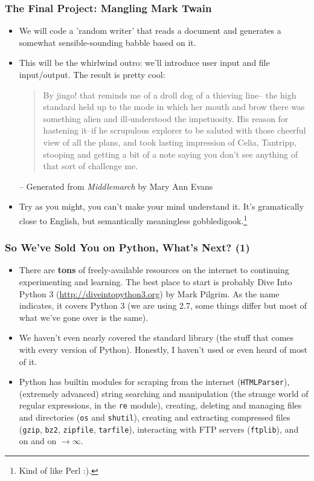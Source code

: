 \documentclass[10pt]{beamer}
\begin{document}
\begin{frame}
  \frametitle{The Final Project: Mangling Mark Twain}
  \begin{itemize}
    \item We will code a 'random writer' that reads a document and generates a somewhat sensible-sounding babble based on it.
    \item This will be the whirlwind outro: we'll introduce user input and file input/output.
      The result is pretty cool: \\
      \begin{quote}
        \small
        By jingo! that reminds me of a droll dog of a thieving line-- the high standard held up to the mode in which her mouth and brow there was something alien and ill-understood the impetuosity.  
        His reason for hastening it--if he scrupulous explorer to be saluted with those cheerful view of all the plans, and took lasting impression of Celia, Tantripp, stooping and getting a bit of a note saying you don't see anything of that sort of challenge me.
      \end{quote}
      \begin{flushright}
        \footnotesize -- Generated from \emph{Middlemarch} by Mary Ann Evans
      \end{flushright}
      \item Try as you might, you can't make your mind understand it.
        It's gramatically close to English, but semantically meaningless gobbledigook.\footnote{Kind of like Perl :).}
  \end{itemize}
\end{frame}

\begin{frame}
  \frametitle{So We've Sold You on Python, What's Next? (1)}
  \begin{itemize}
    \item There are \textbf{tons} of freely-available resources on the internet to continuing experimenting and learning.
    The best place to start is probably Dive Into Python 3 (\href{http://diveintopython3.org}{http://diveintopython3.org}) by Mark Pilgrim.  As the name indicates, it covers Python 3 (we are using 2.7, some things differ but most of what we've gone over is the same).
    \item We haven't even nearly covered the standard library (the stuff that comes with every version of Python). 
      Honestly, I haven't used or even heard of most of it.
    \item Python has builtin modules for scraping from the internet (\texttt{HTMLParser}), (extremely advanced) string searching and manipulation (the strange world of regular expressions, in the \texttt{re} module), creating, deleting and managing files and directories (\texttt{os} and \texttt{shutil}), creating and extracting compressed files (\texttt{gzip}, \texttt{bz2}, \texttt{zipfile}, \texttt{tarfile}), interacting with FTP servers (\texttt{ftplib}), and on and on $\rightarrow \infty$.
  \end{itemize}
\end{frame}
\end{document}
